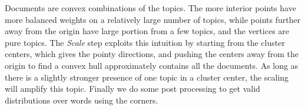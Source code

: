 Documents are convex combinations of the topics. The more interior points have more balanced weights on a relatively large number of topics, while points further away from the origin have large portion from a few topics, and the vertices are pure topics. The {\em Scale} step exploits this intuition by starting from the cluster centers, which gives the pointy directions, and pushing the centers away from the origin to find a convex hull approximately contains all the documents. As long as there is a slightly stronger presence of one topic in a cluster center, the scaling will amplify this topic. Finally we do some post processing to get valid distributions over words using the corners. 
\begin{figure}[h]  
   \begin{center}

        \\ 
        \subfigure[Algorithm illustration with $\delta=0.8$]{

}
\end{center}
\end{figure}
